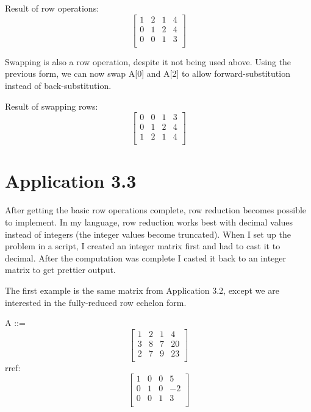 \documentclass{article}
\begin{document}
\begin{flushleft}
Result of row operations:
\[ 
\begin{bmatrix}
1  & 2  & 1  & 4 \\
0  & 1  & 2  & 4 \\
0  & 0  & 1  & 3 \\
\end{bmatrix} 
 \]

Swapping is also a row operation, despite it not being used above. Using the previous form,
we can now swap A[0] and A[2] to allow forward-substitution instead of back-substitution.
\newline


Result of swapping rows:
\[ 
\begin{bmatrix}
0  & 0  & 1  & 3 \\
0  & 1  & 2  & 4 \\
1  & 2  & 1  & 4 \\
\end{bmatrix} 
 \]



\section*{Application 3.3}

After getting the basic row operations complete, row reduction becomes possible to implement.
In my language, row reduction works best with decimal values instead of integers (the integer
values become truncated). When I set up the problem in a script, I created an integer matrix
first and had to cast it to decimal. After the computation was complete I casted it back to
an integer matrix to get prettier output.
\newline

The first example is the same matrix from Application 3.2, except we are interested in the
fully-reduced row echelon form.
\newline

A ::=
\[ 
\begin{bmatrix} 
1  & 2  & 1  & 4 \\
3  & 8  & 7  & 20 \\
2  & 7  & 9  & 23 \\
\end{bmatrix} 
 \]
rref:
\[ 
\begin{bmatrix} 
1  & 0  & 0  & 5 \\
0  & 1  & 0  & -2 \\
0  & 0  & 1  & 3 \\
\end{bmatrix} 
 \]



\end{flushleft}
\end{document}
